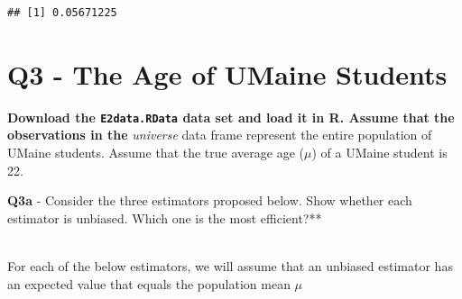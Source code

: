 \documentclass[
]{article}
\begin{document}
\begin{verbatim}
## [1] 0.05671225
\end{verbatim}

\hfill\break

\hypertarget{q3---the-age-of-umaine-students}{%
\section{Q3 - The Age of UMaine
Students}\label{q3---the-age-of-umaine-students}}

\textbf{Download the \texttt{E2data.RData} data set and load it in R.
Assume that the observations in the} \textit{universe} data frame
represent the entire population of UMaine students. Assume that the true
average age (\(\mu\)) of a UMaine student is 22.

\hfill\break

\textbf{Q3a} - Consider the three estimators proposed below. Show
whether each estimator is unbiased. Which one is the most efficient?**\\
\strut \\
For each of the below estimators, we will assume that an unbiased
estimator has an expected value that equals the population mean \(\mu\)
\end{document}
